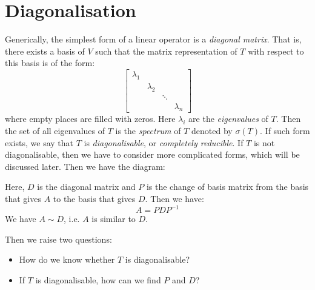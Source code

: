 \section{Diagonalisation}
Generically, the simplest form of a linear operator is a \emph{diagonal matrix}. That is, there exists a basis of $V$ such that the matrix representation of $T$ with respect to this basis is of the form:
\[
  \begin{bmatrix}
    \lambda_1 &           &        &           \\
              & \lambda_2 &        &           \\
              &           & \ddots &           \\
              &           &        & \lambda_n
  \end{bmatrix}
\]
where empty places are filled with zeros. Here $\lambda_i$ are the \emph{eigenvalues} of $T$. Then the set of all eigenvalues of $T$ is the \emph{spectrum} of $T$ denoted by $\sigma(T)$. If such form exists, we say that $T$ is \emph{diagonalisable}, or \emph{completely reducible}. If $T$ is not diagonalisable, then we have to consider more complicated forms, which will be discussed later. Then we have the diagram:
\begin{center}
\end{center}
Here, $D$ is the diagonal matrix and $P$ is the change of basis matrix from the basis that gives $A$ to the basis that gives $D$. Then we have:
\[
  A = P D P^{-1}
\]
We have $A \sim D$, i.e. $A$ is similar to $D$.

Then we raise two questions:
\begin{itemize}
  \item How do we know whether $T$ is diagonalisable?
  \item If $T$ is diagonalisable, how can we find $P$ and $D$?
\end{itemize}

